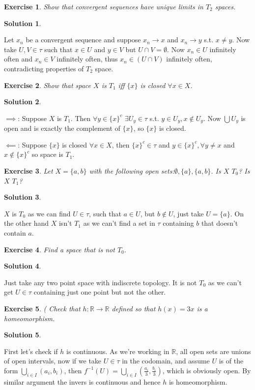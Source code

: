 \documentclass[11pt,a4paper]{article}
\newtheorem{Ex}{Exercise}
\newtheorem{Sol}{Solution}
\begin{document}
\begin{Ex}
	Show that convergent sequences have unique limits in $T_2$ spaces.
\end{Ex}
\begin{Sol} \end{Sol}
\noindent Let $x_n$ be a convergent sequence and suppose $x_n \rightarrow x$ and $x_n \rightarrow y$ s.t. $x \neq y$. Now take $U,V \in \tau $ such that $x \in U$ and $y \in V$ but $U \cap V = \emptyset$. Now $x_n \in U$ infinitely often and $x_n \in V$ infinitely often, thus $x_n \in (U \cap V)$ infinitely often, contradicting properties of $T_2$ space.

\begin{Ex}
	Show that space $X$ is $T_1$ iff $\{x\}$ is closed $\forall x \in X$.
\end{Ex}

\begin{Sol} \end{Sol}
\noindent $\implies$: Suppose $X$ is $T_1$. Then $\forall y \in \{x\}^c$  $\exists U_y \in \tau$ s.t. $y \in U_y, x\not\in U_y$. Now $\bigcup U_y$ is open and is exactly the complement of $\{x\}$, so $\{x\}$ is closed.  

\noindent$\impliedby$: Suppose $\{x\}$ is closed $\forall x \in X$, then $\{x\}^c \in \tau$ and $y \in \{x\}^c, \forall y\neq x$ and $x \not\in \{x\}^c$ so space is $T_1$.

\begin{Ex}
Let $X=\{a,b\}$ with the following open sets:$\emptyset, \{a\}, \{a,b\}$. Is $X$ $T_0$? Is $X$ $T_1$? 
\end{Ex}

\begin{Sol} \end{Sol}
\noindent $X$ is $T_0$ as we can find $U \in \tau$, such that $a \in U$, but $b \not\in U$, just take $U = \{a\}$. On the other hand $X$ isn't $T_1$ as we can't find a set in $\tau$ containing $b$ that doesn't contain $a$. 

\begin{Ex}
	Find a space that is not $T_0$.
\end{Ex}

\begin{Sol} \end{Sol}
\noindent Just take any two point space with indiscrete topology. It is not $T_0$ as we can't get $U \in \tau$ containing just one point but not the other.

\begin{Ex}(
	Check that $h: \mathbb{R} \rightarrow \mathbb{R}$ defined so that $h(x) = 3x$ is a homeomorphism.
\end{Ex} 
\begin{Sol} \end{Sol}
\noindent First let's check if $h$ is continuous. As we're working in $\mathbb{R}$, all open sets are unions of open intervals, now if we take $U \in \tau$ in the codomain, and assume $U$ is of the form $\bigcup_{i \in I}(a_i, b_i)$, then $f^{-1}(U) = \bigcup_{i \in I}(\frac{a_i}{3}, \frac{b_i}{3})$, which is obviously open. By similar argument the invers is continuous and hence $h$ is homeomorphism. 
\end{document}
